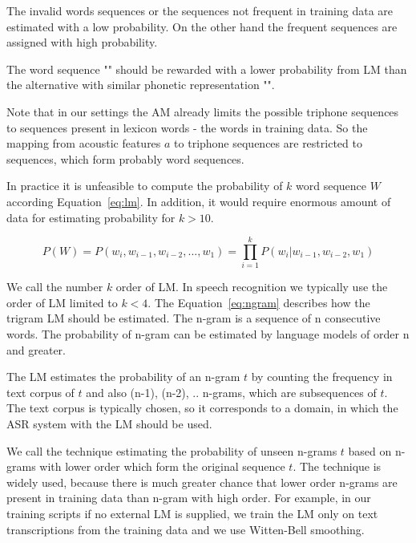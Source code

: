 {The invalid words sequences or the sequences not frequent in training data
are estimated with a low probability. On the other hand the frequent sequences
are assigned with high probability.

The word sequence "" should be rewarded 
with a lower probability from \ac{LM} than the alternative with similar phonetic representation
"".

Note that in our settings the \ac{AM} already limits the possible triphone
sequences to sequences present in lexicon words - the words in training data.
So the mapping from acoustic features $a$ to triphone sequences
are restricted to sequences, which form probably word sequences.

In practice it is unfeasible to compute the probability
of $k$ word sequence $W$ according Equation~\ref{eq:lm}.
In addition, it would require enormous amount of data for estimating
probability for $k>10$.


\begin{equation} \label{eq:lm}
    P(W)=P(w_i,  w_{i-1}, w_{i-2}, ..., w_1)=\prod_{i=1}^{k}{P(w_i|w_{i-1}, w_{i-2}, w_1)}
\end{equation}

We call the number $k$ order of \ac{LM}.
In speech recognition we typically use the order of \ac{LM} limited to $k<4$.
The Equation~\ref{eq:ngram} describes how the trigram \ac{LM} should be estimated.
The n-gram is a sequence of n consecutive words. The probability of n-gram can be estimated by language models
of order n and greater.

The \ac{LM} estimates the probability of an n-gram $t$ by counting the frequency in text corpus of $t$ and 
also (n-1), (n-2), .. n-grams, which are subsequences of $t$.
The text corpus is typically chosen, so it corresponds to a domain, in which the \ac{ASR} system 
with the \ac{LM} should be used.

We call the  technique estimating the probability of unseen n-grams $t$ 
based on n-grams with lower order which form the original sequence $t$.
The technique is widely used, because there is much greater chance that lower order n-grams are
present in training data than n-gram with high order.
For example, in our training scripts if no external \ac{LM} is supplied,
we train the \ac{LM} only on text transcriptions from the training data
and we use Witten-Bell smoothing.\cite{witten1991zero}

}
